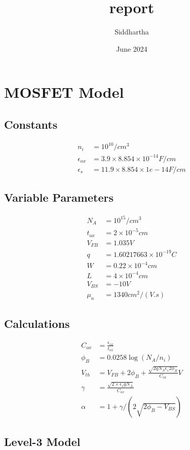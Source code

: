 \documentclass{article}
\title{report}
\author{Siddhartha }
\date{June 2024}
\begin{document}
\maketitle

\section{MOSFET Model}
\subsection{Constants}
\begin{align}    
    n_i &= 10^{10}/cm^3 \\
    \epsilon_{ox} &= 3.9\times8.854\times10^{-14} F/cm  \\
    \epsilon_s &= 11.9\times8.854\times1e-14 F/cm  
\end{align}

\subsection{Variable Parameters}
\begin{align}
    N_A &= 10^{15} /cm^{3} \\
    t_{ox} &= 2\times10^{-5} cm \\
    V_{FB} &= 1.035  V \\
    q &= 1.60217663 \times 10^{-19}  C \\
    W &= 0.22 \times 10^{-4} cm \\
    L &= 4  \times 10^{-4}  cm \\
    V_{BS} &= -10 V \\
    \mu_n  &= 1340 cm^2/(V.s) 
\end{align}
\subsection{Calculations}
\begin{align}
    C_{ox} &= \frac{\epsilon_{ox}}{t_{ox}} \\
    \phi_B &= 0.0258\log(N_A/n_i)\\
    V_{th} &= V_{FB} + 2 \phi_{B} + \frac{\sqrt{2q N_A \epsilon_s 2 \phi_B}}{C_{ox}}  V  \\
    \gamma &= \frac{\sqrt{2\times\epsilon_s q N_A}}{C_{ox}} \\
    \alpha &= 1 + \gamma/(2\sqrt{2\phi_B-V_{BS}}) 
\end{align}
\subsection{Level-3 Model}
\end{document}
